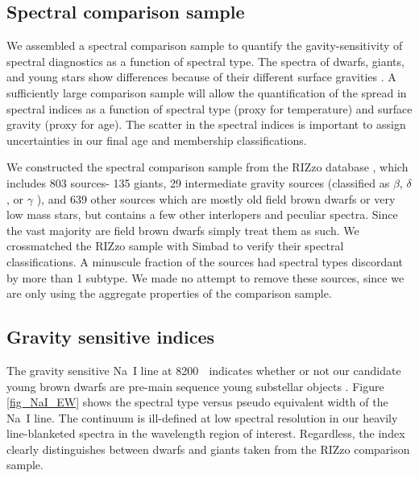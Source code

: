 \subsection{Spectral comparison sample}
We assembled a spectral comparison sample to quantify the gavity-sensitivity of spectral diagnostics as a function of spectral type.  The spectra of dwarfs, giants, and young stars show differences because of their different surface gravities \citep{2012AJ....143..114S}.  A sufficiently large comparison sample will allow the quantification of the spread in spectral indices as a function of spectral type (proxy for temperature) and surface gravity (proxy for age).  The scatter in the spectral indices is important to assign uncertainties in our final age and membership classifications.

We constructed the spectral comparison sample from the RIZzo database \citep{cruz_kelle_2014_10721}, which includes 803 sources- 135 giants, 29 intermediate gravity sources (classified as $\beta$, $\delta$, or $\gamma$ \citep{2009AJ....137.3345C}), and 639 other sources which are mostly old field brown dwarfs or very low mass stars, but contains a few other interlopers and peculiar spectra.  Since the vast majority are field brown dwarfs simply treat them as such.  We crossmatched the RIZzo sample with Simbad to verify their spectral classifications.  A minuscule fraction of the sources had spectral types discordant by more than 1 subtype.  We made no attempt to remove these sources, since we are only using the aggregate properties of the comparison sample.

\subsection{Gravity sensitive indices}
The gravity sensitive Na~I line at 8200 \angstrom$\;$ indicates whether or not our candidate young brown dwarfs are pre-main sequence young substellar objects \citep{1999ApJ...525..466L,2007AJ....134.2398C,2009AJ....137.3345C}.  Figure \ref{fig_NaI_EW} shows the spectral type versus pseudo equivalent width of the Na~I line.  The continuum is ill-defined at low spectral resolution in our heavily line-blanketed spectra in the wavelength region of interest.  Regardless, the index clearly distinguishes between dwarfs and giants taken from the RIZzo comparison sample.

